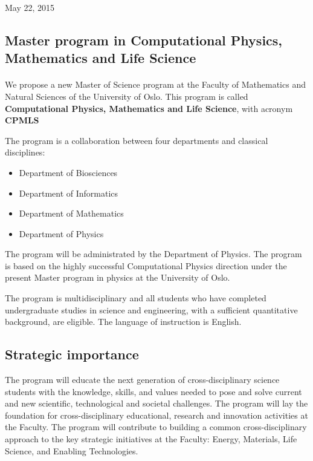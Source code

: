\documentclass[%
twoside,                 %
final,                   %
10pt]{article}
\begin{document}
\begin{center} %
May 22, 2015
\end{center}

\vspace{1cm}


\subsection*{Master program in Computational Physics, Mathematics and Life Science}

\paragraph{}
We propose a new Master of Science program at the Faculty of Mathematics and Natural Sciences of the University of Oslo. This program is called  \textbf{Computational Physics, Mathematics and Life Science}, with acronym  \textbf{CPMLS} 


The program is a collaboration between four departments and classical disciplines:

\begin{itemize}
 \item Department of Biosciences

 \item Department of Informatics

 \item Department of Mathematics

 \item Department of Physics
\end{itemize}

\noindent
The program will be administrated by the Department of Physics. 
The program is based on the highly successful Computational Physics direction under the present Master program
in physics at the University of Oslo.

The program is multidisciplinary and all students who have completed
undergraduate studies in science and engineering, with a sufficient
quantitative background, are eligible.  The language of instruction is
English.



\subsection*{Strategic importance}

The program will educate the next generation of cross-disciplinary
science students with the knowledge, skills, and values needed to pose
and solve current and new scientific, technological and societal
challenges. The program will lay the foundation for cross-disciplinary
educational, research and innovation activities at the Faculty. The
program will contribute to building a common cross-disciplinary
approach to the key strategic initiatives at the Faculty: Energy,
Materials, Life Science, and Enabling Technologies.
\end{document}

